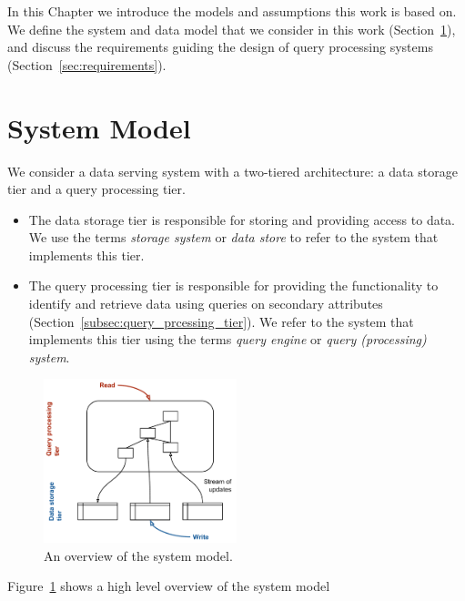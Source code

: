 In this Chapter we introduce the models and assumptions this work is based on.
We define the system and data model that we consider in this work (Section~\ref{sec:models}),
and discuss the requirements guiding the design of query processing systems (Section~\ref{sec:requirements}).

\section{System Model}
\label{sec:models}
We consider a data serving system with a two-tiered architecture: a data storage tier and a query processing tier.

\begin{itemize}
  \item The data storage tier is responsible for storing and providing access to data.
  We use the terms \textit{storage system} or \textit{data store} to refer to the system that implements this tier.

  \item The query processing tier is responsible for providing the functionality to identify and retrieve data using
  queries on secondary attributes (Section~\ref{subsec:query_prcessing_tier}).
  We refer to the system that implements this tier using the terms \textit{query engine} or \textit{query (processing) system}.
\end{itemize}

\begin{figure}
  \centering
    \includegraphics[width=0.5\textwidth]{./figures/models/data_flow.pdf}
  \caption{An overview of the system model.}
  \label{fig:high_level_dataflow}
\end{figure}

\noindent
Figure~\ref{fig:high_level_dataflow} shows a high level overview of the system model

